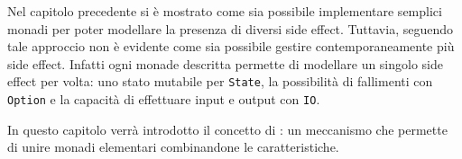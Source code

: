 Nel capitolo precedente si è mostrato come sia possibile implementare semplici monadi per poter modellare la presenza di diversi side effect.
Tuttavia, seguendo tale approccio non è evidente come sia possibile gestire contemporaneamente più side effect. Infatti ogni monade descritta permette di modellare un singolo side effect per volta: uno stato mutabile per \lstinline{State}, la possibilità di fallimenti con \lstinline{Option} e la capacità di effettuare input e output con \lstinline{IO}.

In questo capitolo verrà introdotto il concetto di : un meccanismo che permette di unire monadi elementari combinandone le caratteristiche.

